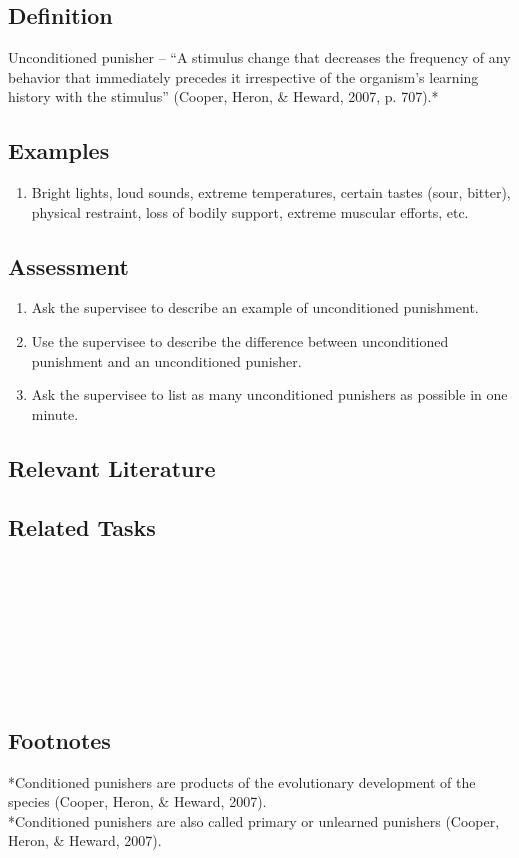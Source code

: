 \clearpage \section{\fourFKNineteen{}}
\subsection{Definition}
Unconditioned punisher – ``A stimulus change that decreases the frequency of any behavior that immediately precedes it irrespective of the organism's learning history with the stimulus'' (Cooper, Heron, \& Heward, 2007, p. 707).*
%
\subsection{Examples}
\begin{enumerate}
\item Bright lights, loud sounds, extreme temperatures, certain tastes (sour, bitter), physical restraint, loss of bodily support, extreme muscular efforts, etc.
%
\end{enumerate}
%
\subsection{Assessment}
\begin{enumerate}
\item Ask the supervisee to describe an example of unconditioned punishment.
\item Use the supervisee to describe the difference between unconditioned punishment and an unconditioned punisher.
\item Ask the supervisee to list as many unconditioned punishers as possible in one minute.
%
\end{enumerate}
%
\subsection{Relevant Literature}
\begin{refsection}
\nocite{cooper2007applied,
        herman1964punishment}
\printbibliography[heading=none]
\end{refsection} 
%    
%
\subsection{Related Tasks}
\fourdSeventeen{}\\
\fourdSixteen{}\\
\fourdNineteen{}\\
\foureEleven{}\\
\fourgSeven{}\\
\fourjTen{}\\
\fourFKTwenty{}\\
%
\subsection{Footnotes}
*Conditioned punishers are products of the evolutionary development of the species (Cooper, Heron, \& Heward, 2007).\\
*Conditioned punishers are also called primary or unlearned punishers (Cooper, Heron, \& Heward, 2007).\\
